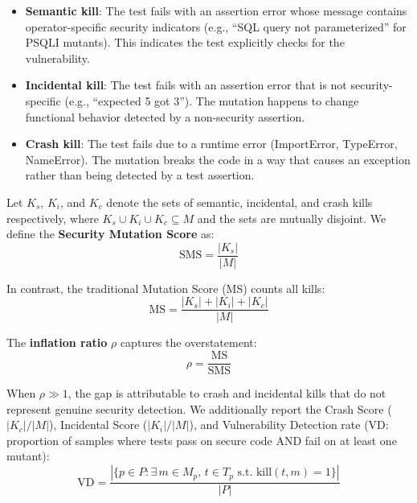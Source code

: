 \documentclass[sigconf,review,anonymous]{acmart}
\begin{document}
\begin{itemize}
    \item \textbf{Semantic kill}: The test fails with an assertion error whose message contains operator-specific security indicators (e.g., ``SQL query not parameterized'' for \textsc{PSQLI} mutants). This indicates the test explicitly checks for the vulnerability.
    
    \item \textbf{Incidental kill}: The test fails with an assertion error that is not security-specific (e.g., ``expected 5 got 3''). The mutation happens to change functional behavior detected by a non-security assertion.
    
    \item \textbf{Crash kill}: The test fails due to a runtime error (ImportError, TypeError, NameError). The mutation breaks the code in a way that causes an exception rather than being detected by a test assertion.
\end{itemize}

\noindent Let $K_s$, $K_i$, and $K_c$ denote the sets of semantic, incidental, and crash kills respectively, where $K_s \cup K_i \cup K_c \subseteq M$ and the sets are mutually disjoint. We define the \textbf{Security Mutation Score} as:
\begin{equation}
    \text{SMS} = \frac{|K_s|}{|M|}
\end{equation}

\noindent In contrast, the traditional Mutation Score (MS) counts all kills:
\begin{equation}
    \text{MS} = \frac{|K_s| + |K_i| + |K_c|}{|M|}
\end{equation}

\noindent The \textbf{inflation ratio} $\rho$ captures the overstatement:
\begin{equation}
    \rho = \frac{\text{MS}}{\text{SMS}}
\end{equation}

\noindent When $\rho \gg 1$, the gap is attributable to crash and incidental kills that do not represent genuine security detection. We additionally report the Crash Score ($|K_c| / |M|$), Incidental Score ($|K_i| / |M|$), and Vulnerability Detection rate (VD: proportion of samples where tests pass on secure code AND fail on at least one mutant):
\begin{equation}
    \text{VD} = \frac{|\{p \in P : \exists\, m \in M_p,\, t \in T_p \text{ s.t. } \text{kill}(t, m) = 1\}|}{|P|}
\end{equation}
\end{document}
